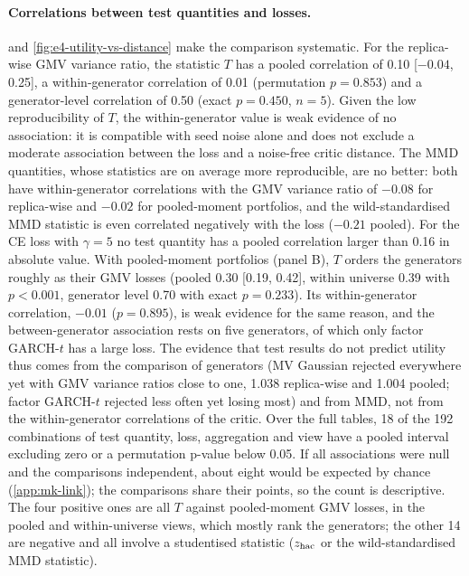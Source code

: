 \paragraph{Correlations between test quantities and losses.}
 and \cref{fig:e4-utility-vs-distance} make the comparison systematic. For the
replica-wise GMV variance ratio, the \WC{} statistic $T$ has a pooled correlation of 0.10
[$-0.04$, 0.25], a within-generator correlation of 0.01 (permutation $p=0.853$) and a
generator-level correlation of 0.50 (exact $p=0.450$, $n=5$). Given the low reproducibility of
$T$, the within-generator value is weak evidence of no association: it is compatible with seed
noise alone and does not exclude a moderate association between the loss and a noise-free critic
distance. The MMD quantities, whose statistics are on average more reproducible, are no better:
both have within-generator correlations with the GMV variance ratio of $-0.08$ for replica-wise
and $-0.02$ for pooled-moment portfolios, and the wild-standardised MMD statistic is even
correlated negatively with the loss ($-0.21$ pooled). For the CE loss with $\gamma=5$ no test
quantity has a pooled correlation larger than 0.16 in absolute value. With pooled-moment
portfolios (panel B), $T$ orders the generators roughly as their GMV losses (pooled 0.30 [0.19,
0.42], within universe 0.39 with $p<0.001$, generator level 0.70 with exact $p=0.233$). Its
within-generator correlation, $-0.01$ ($p=0.895$), is weak evidence for the same reason, and the
between-generator association rests on five generators, of which only factor GARCH-$t$ has a
large loss. The evidence that test results do not predict utility thus comes from the comparison
of generators (MV Gaussian rejected everywhere yet with GMV variance ratios close to one, 1.038
replica-wise and 1.004 pooled; factor GARCH-$t$ rejected less often yet losing most) and from MMD, not from the within-generator correlations of the critic.
Over the full tables, 18 of the 192 combinations of test quantity, loss, aggregation and view have
a pooled interval excluding zero or a permutation p-value below 0.05. If all associations were null and
the comparisons independent, about eight would be expected by chance (\cref{app:mk-link}); the
comparisons share their points, so the count is descriptive. The four positive ones are all $T$
against pooled-moment GMV losses, in the pooled and within-universe views, which mostly rank the
generators; the other 14 are negative and all involve a studentised statistic ($z_{\mathrm{hac}}$ or the
wild-standardised MMD statistic).

